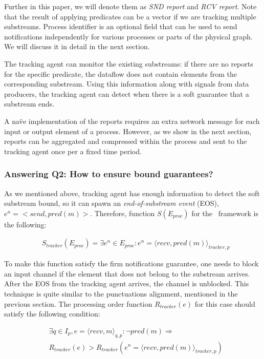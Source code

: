 Further in this paper, we will denote them as {\em SND report} and {\em RCV report}. Note that the result of applying predicates can be a vector if we are tracking multiple substreams. Process identifier is an optional field that can be used to send notifications independently for various processes or parts of the physical graph. We will discuss it in detail in the next section.

The tracking agent can monitor the existing substreams: if there are no reports for the specific predicate, the dataflow does not contain elements from the corresponding substream. Using this information along with signals from data producers, the tracking agent can detect when there is a soft guarantee that a substream ends.

A na\"ve implementation of the reports requires an extra network message for each input or output element of a process. However, as we show in the next section, reports can be aggregated and compressed within the process and sent to the tracking agent once per a fixed time period.

\subsubsection{Answering Q2: How to ensure bound guarantees?}

As we mentioned above, tracking agent has enough information to detect the soft substream bound, so it can spawn an {\em end-of-substream event} (EOS), $e^{n} = <send,pred(m)>$. Therefore, function $S(E_{proc})$ for the \tracker\ framework is the following:

\begin{align*}
& S_{tracker}(E_{proc}) = \exists e^{n} \in E_{proc} : e^{n} = \langle recv,pred(m)\rangle_{tracker,p}
\end{align*}

To make this function satisfy the firm notifications guarantee, one needs to block an input channel if the element that does not belong to the substream arrives. After the EOS from the tracking agent arrives, the channel is unblocked. This technique is quite similar to the punctuations alignment, mentioned in the previous section. The processing order function $R_{tracker}(e)$ for this case should satisfy the following condition:

\begin{align*}
& \exists q \in I_p, e = \langle recv,m \rangle_{q,p}: \neg pred(m) \Longrightarrow \\ 
& R_{tracker}(e) > R_{tracker}(e^{n}= \langle recv,pred(m) \rangle_{tracker,p})
\end{align*}


